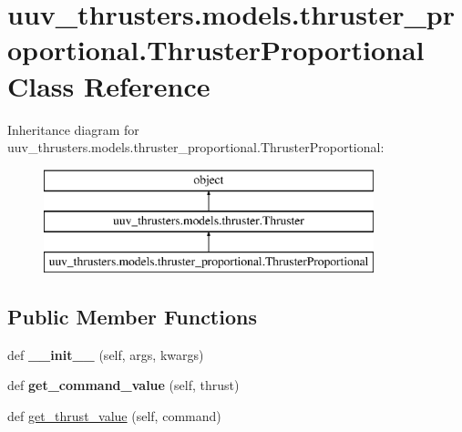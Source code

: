 \hypertarget{classuuv__thrusters_1_1models_1_1thruster__proportional_1_1ThrusterProportional}{}\section{uuv\+\_\+thrusters.\+models.\+thruster\+\_\+proportional.\+Thruster\+Proportional Class Reference}
\label{classuuv__thrusters_1_1models_1_1thruster__proportional_1_1ThrusterProportional}
Inheritance diagram for uuv\+\_\+thrusters.\+models.\+thruster\+\_\+proportional.\+Thruster\+Proportional\+:\begin{figure}[H]
\begin{center}
\leavevmode
\includegraphics[height=3.000000cm]{classuuv__thrusters_1_1models_1_1thruster__proportional_1_1ThrusterProportional}
\end{center}
\end{figure}
\subsection*{Public Member Functions}
\begin{DoxyCompactItemize}
\item 
\mbox{\label{classuuv__thrusters_1_1models_1_1thruster__proportional_1_1ThrusterProportional_ad2d02699894c84e42a744a3bee7ebcb6}} 
def {\bfseries \+\_\+\+\_\+init\+\_\+\+\_\+} (self, args, kwargs)
\item 
\mbox{\label{classuuv__thrusters_1_1models_1_1thruster__proportional_1_1ThrusterProportional_ac6dbd251b6c6e043a2158e755ecc2ed7}} 
def {\bfseries get\+\_\+command\+\_\+value} (self, thrust)
\item 
def \hyperlink{classuuv__thrusters_1_1models_1_1thruster__proportional_1_1ThrusterProportional_a8ce50c4afd1fbd05d4fb700385cd69b0}{get\+\_\+thrust\+\_\+value} (self, command)
\end{DoxyCompactItemize}
